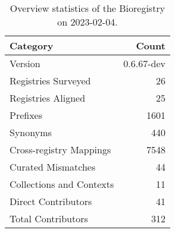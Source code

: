 \begin{table}
\centering
\caption{Overview statistics of the Bioregistry on 2023-02-04.}
\label{tab:bioregistry-summary}
\begin{tabular}{lr}
\toprule
                Category &      Count \\
\midrule
                 Version & 0.6.67-dev \\
     Registries Surveyed &         26 \\
      Registries Aligned &         25 \\
                Prefixes &       1601 \\
                Synonyms &        440 \\
 Cross-registry Mappings &       7548 \\
      Curated Mismatches &         44 \\
Collections and Contexts &         11 \\
     Direct Contributors &         41 \\
      Total Contributors &        312 \\
\bottomrule
\end{tabular}
\end{table}
